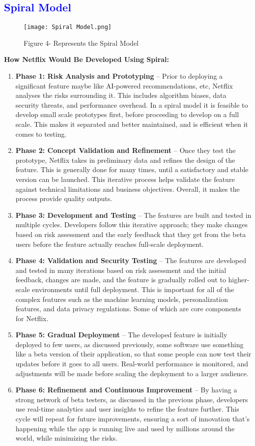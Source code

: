 \documentclass[a4paper,10pt,twoside]{article}
\begin{document}
\subsection{\textcolor{Blue}{Spiral Model}}
\begin{figure}[h]
\centering
\texttt{[image: Spiral Model.png]}
\caption{Figure 4- Represents the Spiral Model}
\label{fig:spiral}
\end{figure}
\newpage
\textbf{How Netflix Would Be Developed Using Spiral:}
\begin{enumerate}
    \item \textbf{Phase 1: Risk Analysis and Prototyping} – Prior to deploying a significant feature maybe like AI-powered recommendations, etc, Netflix analyses the risks surrounding it. This includes algorithm biases, data security threats, and performance overhead. In a spiral model it is feasible to develop small scale prototypes first, before proceeding to develop on a full scale. This makes it separated and better maintained, and is efficient when it comes to testing.
    \item \textbf{Phase 2: Concept Validation and Refinement} – Once they test the prototype, Netflix takes in preliminary data and refines the design of the feature. This is generally done for many times, until a satisfactory and stable version can be launched. This iterative process helps validate the feature against technical limitations and business objectives. Overall, it makes the process provide quality outputs.
    \item \textbf{Phase 3: Development and Testing} – The features are built and tested in multiple cycles. Developers follow this iterative approach; they make changes based on risk assessment and the early feedback that they get from the beta users before the feature actually reaches full-scale deployment.
    \item \textbf{Phase 4: Validation and Security Testing} – The features are developed and tested in many iterations based on risk assessment and the initial feedback, changes are made, and the feature is gradually rolled out to higher-scale environments until full deployment. This is important for all of the complex features such as the machine learning models, personalization features, and data privacy regulations. Some of which are core components for Netflix.
    \item \textbf{Phase 5: Gradual Deployment} – The developed feature is initially deployed to few users, as discussed previously, some software use something like a beta version of their application, so that some people can now test their updates before it goes to all users. Real-world performance is monitored, and adjustments will be made before scaling the deployment to a larger audience.
    \item \textbf{Phase 6: Refinement and Continuous Improvement} – By having a strong network of beta testers, as discussed in the previous phase, developers use real-time analytics and user insights to refine the feature further. This cycle will repeat for future improvements, ensuring a sort of innovation that’s happening while the app is running live and used by millions around the world, while minimizing the risks.
\end{enumerate}
\end{document}
